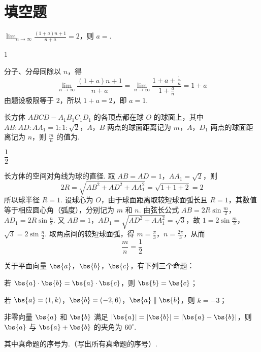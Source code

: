\section{填空题}

\begin{problem}
\(\displaystyle\lim_{n\to \infty}\frac{(1 + a)n + 1}{n + a} = 2\)，则 \(a =\)\fillinblank{}.
\end{problem}

\begin{answer}
1
\end{answer}

\begin{solution}
分子、分母同除以 \(n\)，得
\[
\lim_{n\to\infty}\frac{(1+a)n+1}{n+a}=\lim_{n\to\infty}\frac{1+a+\frac1n}{1+\frac an}=1+a
\]
由题设极限等于 \(2\)，所以 \(1+a=2\)，即 \(a=1\).
\end{solution}

\begin{problem}
长方体 \(ABCD - A_{1}B_{1}C_{1}D_{1}\) 的各顶点都在球 \(O\) 的球面上，其中 \(AB:AD:AA_{1} = 1:1:\sqrt{2}\)，\(A\)，\(B\) 两点的球面距离记为 \(m\)，\(A\)，\(D_{1}\) 两点的球面距离记为 \(n\)，则 \(\frac{m}{n}\) 的值为\fillinblank{}.
\end{problem}

\begin{answer}
\(\dfrac{1}{2}\)
\end{answer}

\begin{solution}
长方体的空间对角线为球的直径. 取 \(AB=AD=1\)，\(AA_1=\sqrt{2}\)，则
\[
2R=\sqrt{AB^2+AD^2+AA_1^2}=\sqrt{1+1+2}=2
\]
所以球半径 \(R=1\). 设球心为 \(O\)，由于球面距离取较短球面弧长且 \(R=1\)，其数值等于相应圆心角（弧度），分别记为 \(m\) 和 \(n\). 由弦长公式
\(AB=2R\sin\frac m2\)，\(AD_1=2R\sin\frac n2\).
又 \(AB=1\)，\(AD_1=\sqrt{AD^2+AA_1^2}=\sqrt3\)，故
\(1=2\sin\frac m2\)，\(\sqrt3=2\sin\frac n2\).
取两点间的较短球面弧，得 \(m=\frac\pi3\)，\(n=\frac{2\pi}3\)，从而
\[
\frac mn=\frac12
\]
\end{solution}

\begin{problem}
关于平面向量 \(\bs{a}\)，\(\bs{b}\)，\(\bs{c}\)，有下列三个命题：

\begin{circlelist}
\item 若 \(\bs{a} \cdot \bs{b} = \bs{a} \cdot \bs{c}\)，则 \(\bs{b} = \bs{c}\)；
\item 若 \(\bs{a} = (1, k)\)，\(\bs{b} = (-2, 6)\)，\(\bs{a} \parallel \bs{b}\)，则 \(k = -3\)；
\item 非零向量 \(\bs{a}\) 和 \(\bs{b}\) 满足 \( |\bs{a}| = |\bs{b}| = |\bs{a} - \bs{b}| \)，则 \(\bs{a}\) 与 \( \bs{a} + \bs{b} \) 的夹角为 \( 60^{\circ} \).
\end{circlelist}

其中真命题的序号为\fillinblank{}.（写出所有真命题的序号）.
\end{problem}

